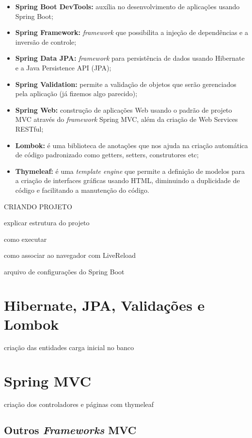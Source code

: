 \begin{itemize}
    \item \textbf{Spring Boot DevTools:} auxília no desenvolvimento de aplicações usando Spring Boot;
    \item \textbf{Spring Framework:} \textit{framework} que possibilita a injeção de dependências e a inversão de controle;
    \item \textbf{Spring Data JPA:} \textit{framework} para persistência de dados usando Hibernate e a Java Persistence API (JPA);
    \item \textbf{Spring Validation:} permite a validação de objetos que serão gerenciados pela aplicação (já fizemos algo parecido);
    \item \textbf{Spring Web:} construção de aplicações Web usando o padrão de projeto MVC através do \textit{framework} Spring MVC, além da criação de Web Services RESTful;
    \item \textbf{Lombok:} é uma biblioteca de anotações que nos ajuda na criação automática de código padronizado como getters, setters, construtores etc;
    \item \textbf{Thymeleaf:} é uma \textit{template engine} que permite a definição de modelos para a criação de interfaces gráficas usando HTML, diminuindo a duplicidade de código e facilitando a manutenção do código.
\end{itemize}

CRIANDO PROJETO

explicar estrutura do projeto

como executar

como associar ao navegador com LiveReload

arquivo de configurações do Spring Boot


\section{Hibernate, JPA, Validações e Lombok}

criação das entidades
carga inicial no banco


\section{Spring MVC}

criação dos controladores e páginas com thymeleaf


\subsection{Outros \textit{Frameworks} MVC}

